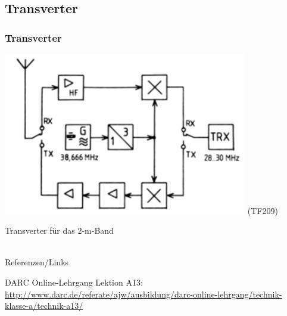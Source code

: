 \subsection{Transverter}

\begin{frame}
    \frametitle{Transverter}

    \begin{center}
        \includegraphics[width=0.8\textwidth]{a13/TF209.png}
        \tiny (TF209)
    \end{center}

    Transverter für das 2-m-Band

\end{frame}

\renewcommand{\refname}{Referenzen}

\hypertarget{refs}{}
\textcolor{white}{} \\ %
\Large Referenzen/Links
\footnotesize

\begin{thebibliography}{}
      DARC Online-Lehrgang Lektion A13:
                    \url{http://www.darc.de/referate/ajw/ausbildung/darc-online-lehrgang/technik-klasse-a/technik-a13/}
\end{thebibliography} 


